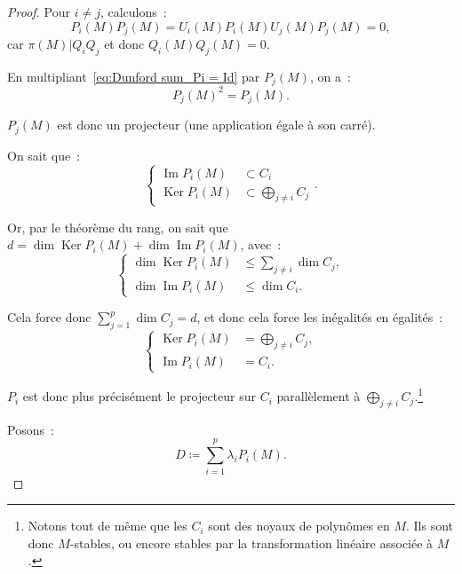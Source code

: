 \documentclass{report}
\theoremstyle{definition}
\theoremstyle{remark}
\numberwithin{equation}{section}
\DeclareMathOperator{\Ker}{Ker}
\DeclareMathOperator{\Imf}{Im}
\begin{document}
\begin{proof}
			Pour $i \neq j$, calculons~:
			\begin{equation}
				P_i(M)P_j(M) = U_i(M)P_i(M)U_j(M)P_j(M) = 0,
			\end{equation}
			car $\pi(M) | Q_iQ_j$ et donc $Q_i(M)Q_j(M) = 0$.

			En multipliant~\eqref{eq:Dunford sum_Pi = Id} par $P_j(M)$, on a~:
			\begin{equation}
				P_j(M)^2 = P_j(M).
			\end{equation}

			$P_j(M)$ est donc un projecteur (une application égale à son carré).

			On sait que~:
			\begin{equation}
				\begin{cases}
				\Imf P_i(M) &\subset C_i \\\Ker P_i(M) &\subset \displaystyle \bigoplus_{j \neq i}C_j
			\end{cases}.
			\end{equation}

			Or, par le théorème du rang, on sait que $d = \dim \Ker P_i(M) + \dim \Imf P_i(M)$, avec~:
			\begin{equation}
				\begin{cases}
				\dim \Ker P_i(M) &\leq \sum_{j \neq i} \dim C_j, \\
				\dim \Imf P_i(M) &\leq \dim C_i.
			\end{cases}
			\end{equation}

			Cela force donc $\sum_{j=1}^p\dim C_j = d$, et donc cela force les inégalités en égalités~:
			\begin{equation}
				\begin{cases}
				\Ker P_i(M) &= \displaystyle \bigoplus_{j \neq i}C_j, \\
				\Imf P_i(M) &= C_i.
			\end{cases}
			\end{equation}

			$P_i$ est donc plus précisément le projecteur sur $C_i$ parallèlement à $\bigoplus_{j \neq i}C_j$.\footnote{Notons tout de même que les $C_i$ sont des
			noyaux de polynômes en $M$. Ils sont donc $M$-stables, ou encore stables par la transformation linéaire associée à $M$.}

			Posons~:
			\begin{equation}
				D \coloneqq \sum_{i=1}^p\lambda_iP_i(M).
			\end{equation}


\end{proof}
\end{document}
